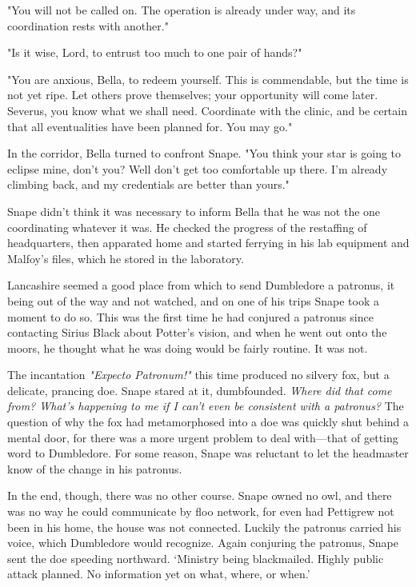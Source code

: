 "You will not be called on. The operation is already under way, and its coordination rests with another."

"Is it wise, Lord, to entrust too much to one pair of hands?"

"You are anxious, Bella, to redeem yourself. This is commendable, but the time is not yet ripe. Let others prove themselves; your opportunity will come later. Severus, you know what we shall need. Coordinate with the clinic, and be certain that all eventualities have been planned for. You may go."

In the corridor, Bella turned to confront Snape. "You think your star is going to eclipse mine, don't you? Well don't get too comfortable up there. I'm already climbing back, and my credentials are better than yours."

Snape didn't think it was necessary to inform Bella that he was not the one coordinating whatever it was. He checked the progress of the restaffing of headquarters, then apparated home and started ferrying in his lab equipment and Malfoy's files, which he stored in the laboratory.

Lancashire seemed a good place from which to send Dumbledore a patronus, it being out of the way and not watched, and on one of his trips Snape took a moment to do so. This was the first time he had conjured a patronus since contacting Sirius Black about Potter's vision, and when he went out onto the moors, he thought what he was doing would be fairly routine. It was not.

The incantation \emph{"Expecto Patronum!"} this time produced no silvery fox, but a delicate, prancing doe. Snape stared at it, dumbfounded. \emph{Where did that come from? What's happening to me if I can't even be consistent with a patronus?} The question of why the fox had metamorphosed into a doe was quickly shut behind a mental door, for there was a more urgent problem to deal with—that of getting word to Dumbledore. For some reason, Snape was reluctant to let the headmaster know of the change in his patronus.

In the end, though, there was no other course. Snape owned no owl, and there was no way he could communicate by floo network, for even had Pettigrew not been in his home, the house was not connected. Luckily the patronus carried his voice, which Dumbledore would recognize. Again conjuring the patronus, Snape sent the doe speeding northward. `Ministry being blackmailed. Highly public attack planned. No information yet on what, where, or when.'

